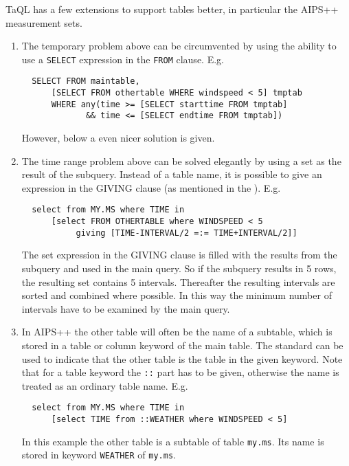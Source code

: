 TaQL has a few extensions to support tables better,
in particular the AIPS++ measurement sets.
\begin{enumerate}
\item
The temporary problem above can be circumvented by using the
ability to use a \texttt{SELECT} expression in the \texttt{FROM}
clause. E.g.
\begin{verbatim}
  SELECT FROM maintable,
      [SELECT FROM othertable WHERE windspeed < 5] tmptab
      WHERE any(time >= [SELECT starttime FROM tmptab]
             && time <= [SELECT endtime FROM tmptab])
\end{verbatim}
However, below a even nicer solution is given. 

\item
The time range problem above can be solved elegantly by using
a set as the result of the subquery. Instead of a table name,
it is possible to give an expression in the GIVING clause (as mentioned
in the ). E.g.
\begin{verbatim}
  select from MY.MS where TIME in
      [select FROM OTHERTABLE where WINDSPEED < 5
           giving [TIME-INTERVAL/2 =:= TIME+INTERVAL/2]]
\end{verbatim}
The set expression in the GIVING clause is filled with the
results from the subquery and used in the main query. So if
the subquery results in 5 rows, the resulting set contains 5
intervals. Thereafter the resulting intervals are sorted and combined
where possible. In this way the minimum number of intervals have to be
examined by the main query.

\item
In AIPS++ the other table will often be the name of a subtable,
which is stored in a table or column keyword of the main table.
The standard  can be used
to indicate that the other table is the table in the given keyword.
Note that for a table keyword the \texttt{::} part has to be given,
otherwise the name is treated as an ordinary table name. E.g.
\begin{verbatim}
  select from MY.MS where TIME in
      [select TIME from ::WEATHER where WINDSPEED < 5]
\end{verbatim}
In this example the other table is a subtable of table \texttt{my.ms}.
Its name is stored in keyword \texttt{WEATHER} of \texttt{my.ms}.


\end{enumerate}
